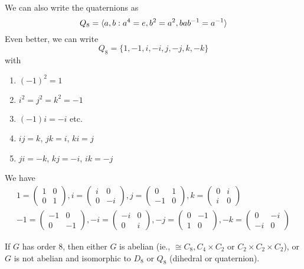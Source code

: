 \documentclass[a4paper]{article}
\begin{document}
  \begin{notation}
    We can also write the quaternions as
    \[
      Q_8 = \langle a, b : a^4 = e, b^2 = a^2, bab^{-1} = a^{-1}\rangle
    \]
    Even better, we can write
    \[
      Q_8 = \{1, -1, i, -i, j, -j, k, -k\}
    \]
    with
    \begin{enumerate}
      \item $(-1)^2 = 1$
      \item $i^2 = j^2 = k^2 = -1$
      \item $(-1)i = -i$ etc.
      \item $ij = k$, $jk = i$, $ki = j$
      \item $ji = -k$, $kj = -i$, $ik = -j$
    \end{enumerate}
    We have
    \begin{gather*}
      1 = \begin{pmatrix}
        1&0\\0&1
      \end{pmatrix}, 
      i = \begin{pmatrix}
        i & 0\\0&-i
      \end{pmatrix},
      j = \begin{pmatrix}
        0&1\\-1&0
      \end{pmatrix},
      k = \begin{pmatrix}
        0&i\\i&0
      \end{pmatrix}\\
      -1 = \begin{pmatrix}
        -1&0\\0&-1
      \end{pmatrix}, 
      -i = \begin{pmatrix}
        -i & 0\\0&i
      \end{pmatrix},
      -j = \begin{pmatrix}
        0&-1\\1&0
      \end{pmatrix},
      -k = \begin{pmatrix}
        0&-i\\-i&0
      \end{pmatrix}
    \end{gather*}
  \end{notation}

  \begin{lemma}
    If $G$ has order 8, then either $G$ is abelian (ie., $\cong C_8, C_4\times C_2$ or $C_2\times C_2\times C_2$), or $G$ is not abelian and isomorphic to $D_8$ or $Q_8$ (dihedral or quaternion).
  \end{lemma}
\end{document}
